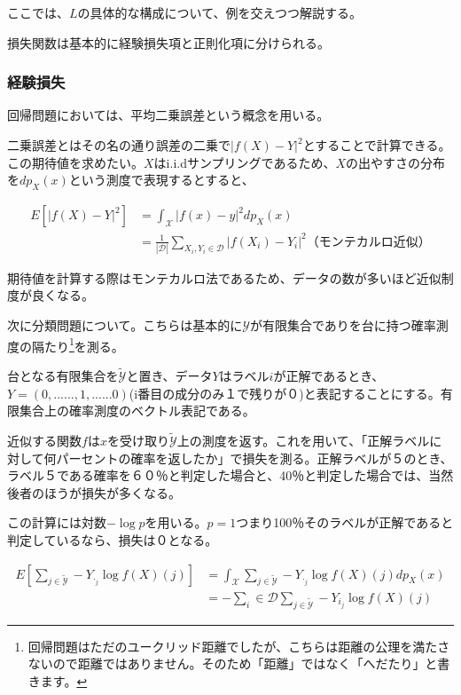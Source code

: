 \documentclass{jsarticle}
\begin{document}
ここでは、$L$の具体的な構成について、例を交えつつ解説する。

損失関数は基本的に経験損失項と正則化項に分けられる。


\subsubsection{経験損失}

回帰問題においては、平均二乗誤差という概念を用いる。

二乗誤差とはその名の通り誤差の二乗で$|f(X)-Y|^2$とすることで計算できる。この期待値を求めたい。$X$はi.i.dサンプリングであるため、$X$の出やすさの分布を$dp_X(x)$という測度で表現するとすると、

\begin{align}
E[|f(X)-Y|^2]&=\int_\mathcal{X}|f(x)-y|^2dp_X(x)\\
&=\frac{1}{|\mathcal{D}|}\sum_{X_i,Y_i\in \mathcal{D}} |f(X_i)-Y_i|^2　（モンテカルロ近似）
\end{align}

期待値を計算する際はモンテカルロ法であるため、データの数が多いほど近似制度が良くなる。


次に分類問題について。こちらは基本的に$\mathcal{Y}$が有限集合でありを台に持つ確率測度の隔たり\footnote{回帰問題はただのユークリッド距離でしたが、こちらは距離の公理を満たさないので距離ではありません。そのため「距離」ではなく「へだたり」と書きます。}を測る。

台となる有限集合を$\tilde{\mathcal{Y}}$と置き、データ$Y$はラベル$i$が正解であるとき、$Y=(0,......,1,......0)$(i番目の成分のみ１で残りが０)と表記することにする。有限集合上の確率測度のベクトル表記である。

近似する関数$f$は$x$を受け取り$\tilde{\mathcal{Y}}$上の測度を返す。これを用いて、「正解ラベルに対して何パーセントの確率を返したか」で損失を測る。正解ラベルが５のとき、ラベル５である確率を６０％と判定した場合と、40％と判定した場合では、当然後者のほうが損失が多くなる。

この計算には対数$-\log{p}$を用いる。$p=1$つまり100％そのラベルが正解であると判定しているなら、損失は０となる。

\begin{align}
E[\sum_{j\in\tilde{\mathcal{Y}}} -Y_{\cdot_j} \log{f(X)(j)}]&=\int_\mathcal{X} \sum_{j\in\tilde{\mathcal{Y}}} -Y_{\cdot_j} \log{f(X)(j)}dp_{X}(x)\\
&=-\sum_i\in\mathcal{D} \sum_{j\in\tilde{\mathcal{Y}}} -Y_{i_j} \log{f(X)(j)}
\end{align}
\end{document}
